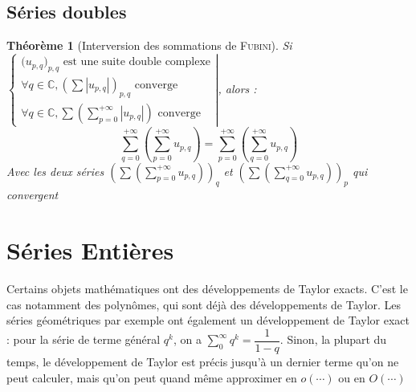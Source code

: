 \documentclass[11pt,a4paper]{report}
\newtheorem{itheorem}[theorem]{Théorème}
\theoremstyle{definition}
\begin{document}
\section{Séries doubles} %
\label{sec:series_doubles}
\begin{itheorem}[Interversion des sommations de \textsc{Fubini}]\label{th:fubini}
    Si 
    $\left\lbrace \begin{array}{l}
        \big( u_{p,q} \big)_{p,q} \text{ est une suite double complexe} \\
        \forall q \in \ensuremath{\mathbb{C}}, \left( \sum \left| u_{p,q}\right| \right)_{p,q} \text{ converge} \\
        \forall q \in \ensuremath{\mathbb{C}}, \sum \left( \sum_{p=0}^{+\infty} \left| u_{p,q}\right| \right) \text{ converge}
    \end{array}\right| $, alors : 
    \begin{equation}
        \sum_{q=0}^{+\infty} \left( \sum_{p=0}^{+\infty} u_{p,q} \right) = \sum_{p=0}^{+\infty} \left( \sum_{q=0}^{+\infty}  u_{p,q} \right) 
    \end{equation}
    Avec les deux séries $\left( \sum \left( \sum_{p=0}^{+\infty} u_{p,q} \right)\right)_q$ et $\left( \sum \left( \sum_{q=0}^{+\infty}  u_{p,q} \right) \right)_p$  qui convergent
\end{itheorem}

\chapter{Séries Entières}
Certains objets mathématiques ont des développements de Taylor exacts. C'est le cas notamment des polynômes, qui sont déjà des développements de Taylor. Les séries géométriques par exemple ont également un développement de Taylor exact : pour la série de terme général $q^k$, on a $\sum_0^\infty q^k = \dfrac{1}{1-q}$. Sinon, la plupart du temps, le développement de Taylor est précis jusqu'à un dernier terme qu'on ne peut calculer, mais qu'on peut quand même approximer en $o(\cdots)$ ou en $O(\cdots)$
\\
\end{document}
